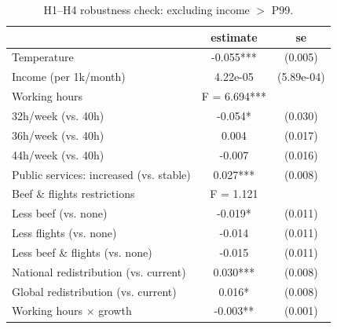\begin{table}[H]
    \centering
    \caption{H1--H4 robustness check: excluding income $>$ P99.}
    \begin{tabular}{ l c c }
\hline \hline
 & estimate & se \\
\hline
\hspace{0.05cm} Temperature & -0.055*** & (0.005) \\
\hspace{0.05cm} Income (per 1k/month) & 4.22e-05 & (5.89e-04) \\
\hspace{0.05cm} Working hours & F = 6.694*** &  \\
\hspace{0.05cm} \hspace{1em} 32h/week (vs. 40h) & -0.054* & (0.030) \\
\hspace{0.05cm} \hspace{1em} 36h/week (vs. 40h) & 0.004 & (0.017) \\
\hspace{0.05cm} \hspace{1em} 44h/week (vs. 40h) & -0.007 & (0.016) \\
\hspace{0.05cm} Public services: increased (vs. stable) & 0.027*** & (0.008) \\
\hspace{0.05cm} Beef \& flights restrictions & F = 1.121 &  \\
\hspace{0.05cm} \hspace{1em} Less beef (vs. none) & -0.019* & (0.011) \\
\hspace{0.05cm} \hspace{1em} Less flights (vs. none) & -0.014 & (0.011) \\
\hspace{0.05cm} \hspace{1em} Less beef \& flights (vs. none) & -0.015 & (0.011) \\
\hspace{0.05cm} National redistribution (vs. current) & 0.030*** & (0.008) \\
\hspace{0.05cm} Global redistribution (vs. current) & 0.016* & (0.008) \\
\hspace{0.05cm} Working hours $\times$ growth & -0.003** & (0.001) \\

\end{tabular}
\end{table}
